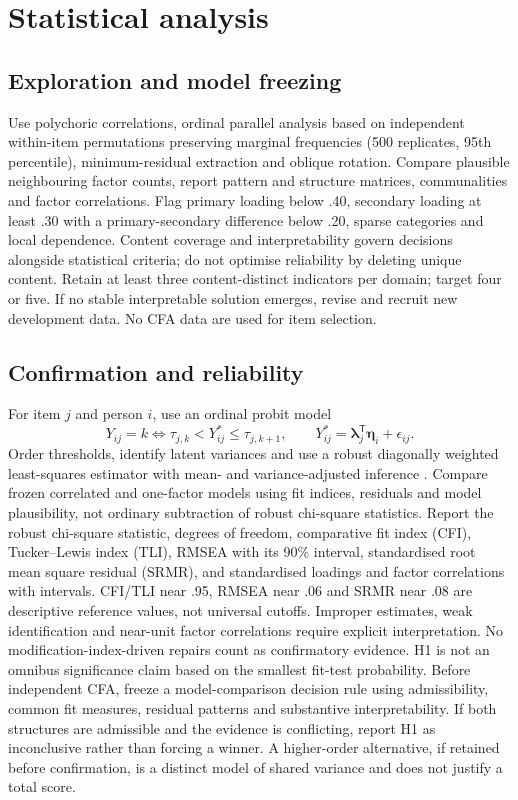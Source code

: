 \section{Statistical analysis}
\subsection{Exploration and model freezing}
Use polychoric correlations, ordinal parallel analysis based on independent within-item permutations preserving marginal frequencies (500 replicates, 95th percentile), minimum-residual extraction and oblique rotation. Compare plausible neighbouring factor counts, report pattern and structure matrices, communalities and factor correlations. Flag primary loading below .40, secondary loading at least .30 with a primary-secondary difference below .20, sparse categories and local dependence. Content coverage and interpretability govern decisions alongside statistical criteria; do not optimise reliability by deleting unique content. Retain at least three content-distinct indicators per domain; target four or five. If no stable interpretable solution emerges, revise and recruit new development data. No CFA data are used for item selection.

\subsection{Confirmation and reliability}
For item $j$ and person $i$, use an ordinal probit model
\[
Y_{ij}=k \iff \tau_{j,k}<Y^{*}_{ij}\leq\tau_{j,k+1},\qquad
Y^{*}_{ij}=\boldsymbol{\lambda}_{j}^{\mathsf T}\boldsymbol{\eta}_i+\epsilon_{ij}.
\]
Order thresholds, identify latent variances and use a robust diagonally weighted least-squares estimator with mean- and variance-adjusted inference \parencite{flora2004}. Compare frozen correlated and one-factor models using fit indices, residuals and model plausibility, not ordinary subtraction of robust chi-square statistics. Report the robust chi-square statistic, degrees of freedom, comparative fit index (CFI), Tucker--Lewis index (TLI), RMSEA with its 90\% interval, standardised root mean square residual (SRMR), and standardised loadings and factor correlations with intervals. CFI/TLI near .95, RMSEA near .06 and SRMR near .08 are descriptive reference values, not universal cutoffs. Improper estimates, weak identification and near-unit factor correlations require explicit interpretation. No modification-index-driven repairs count as confirmatory evidence. H1 is not an omnibus significance claim based on the smallest fit-test probability. Before independent CFA, freeze a model-comparison decision rule using admissibility, common fit measures, residual patterns and substantive interpretability. If both structures are admissible and the evidence is conflicting, report H1 as inconclusive rather than forcing a winner. A higher-order alternative, if retained before confirmation, is a distinct model of shared variance and does not justify a total score.

